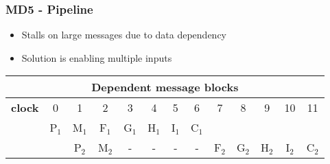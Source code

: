 \begin{frame}
  \frametitle{MD5 - Pipeline}
  \begin{minipage}[t]{\textwidth}
    \begin{itemize}
    \item Stalls on large messages due to data dependency
    \item Solution is enabling multiple inputs
    \end{itemize}
  \end{minipage}
  \begin{minipage}[b]{\textwidth}
    \qquad
    \fontsize{8pt}{2}
    \selectfont
    \centering
    \begin{table}[H]
      \captionsetup{width=.8\linewidth}
      \centering
      \newline
      \vspace*{0.5cm}
      \newline
      \centering
      \begin{tabular}{c c c c c c c c c c c c c}
        \hline
        \multicolumn{13}{c}{Dependent message blocks}\\
        \hline
        \textbf{clock} & 0   &  1  &  2  &  3  &  4   & 5 &  6 &     7 &    8  & 9   &    10  &    11\\
        \hline
                       & P$_1$ & M$_1$ & F$_1$ & G$_1$ & H$_1$  & I$_1$ & C$_1$ &     &        &         &       &     \\
                       &       & P$_2$ & M$_2$ &   -   &   -    &   -    &   -   & F$_2$ & G$_2$ & H$_2$  & I$_2$ & C$_2$ \\
      \end{tabular}
    \end{table}
  \end{minipage}
\end{frame}
